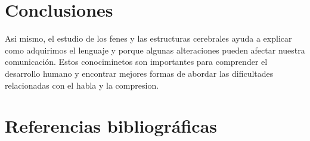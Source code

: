 \documentclass[12pt]{article}
\begin{document}
\section{Conclusiones}


Asi mismo, el estudio de los fenes y las estructuras cerebrales ayuda a explicar como adquirimos el lenguaje y porque algunas alteraciones pueden afectar nuestra comunicación. Estos conociminetos son importantes para comprender el desarrollo humano y encontrar mejores formas de abordar las dificultades relacionadas con el habla y la compresion.

\section{Referencias bibliográficas}
\end{document}
